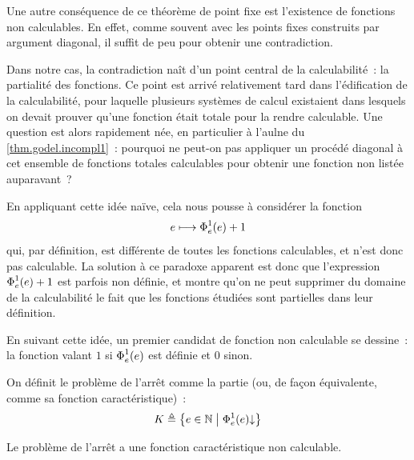 Une autre conséquence de ce théorème de point fixe est l'existence de fonctions
non calculables. En effet, comme souvent avec les points fixes construits par
argument diagonal, il suffit de peu pour obtenir une contradiction.

Dans notre cas, la contradiction naît d'un point central de la calculabilité~:
la partialité des fonctions. Ce point est arrivé relativement tard dans
l'édification de la calculabilité, pour laquelle plusieurs systèmes de calcul
existaient dans lesquels on devait prouver qu'une fonction était totale pour la
rendre calculable. Une question est alors rapidement née, en particulier à
l'aulne du \cref{thm.godel.incompl1}~: pourquoi ne peut-on pas appliquer
un procédé diagonal à cet ensemble de fonctions totales calculables pour obtenir
une fonction non listée auparavant~?

En appliquant cette idée naïve, cela nous pousse à considérer la fonction
\[e \longmapsto \operatorname{\Phi}_{e}^{1}(e) + 1\]
qui, par définition, est différente de toutes les fonctions calculables, et
n'est donc pas calculable. La solution à ce paradoxe apparent est donc que
l'expression $\operatorname{\Phi}_{e}^{1}(e) + 1$ est parfois non définie, et montre qu'on ne
peut supprimer du domaine de la calculabilité le fait que les fonctions étudiées
sont partielles dans leur définition.

En suivant cette idée, un premier candidat de fonction non calculable se
dessine~: la fonction valant $1$ si $\operatorname{\Phi}_{e}^{1}(e)$ est définie et $0$ sinon.

\begin{definition}
  On définit le problème de l'arrêt comme la partie (ou, de façon équivalente,
  comme sa fonction caractéristique)~:
  \[K \triangleq \left\{ e \in \mathbb N \;\middle\vert\; \operatorname{\Phi}_{e}^{1}(e)\mathbin{\downarrow} \right\}\]
  \index[notation]{$\KH$}
\end{definition}

\begin{theorem}\label{thm.arret.indec}
  Le problème de l'arrêt a une fonction caractéristique non calculable.
\end{theorem}

